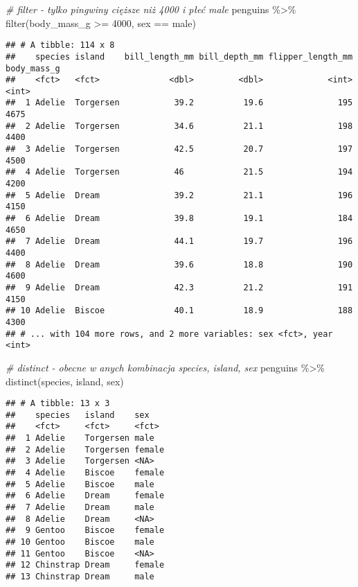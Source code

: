 \documentclass[
]{book}
\newenvironment{Shaded}{\begin{snugshade}}{\end{snugshade}}
\newcommand{\CommentTok}[1]{\textcolor[rgb]{0.56,0.35,0.01}{\textit{#1}}}
\newcommand{\DecValTok}[1]{\textcolor[rgb]{0.00,0.00,0.81}{#1}}
\newcommand{\FunctionTok}[1]{\textcolor[rgb]{0.00,0.00,0.00}{#1}}
\newcommand{\NormalTok}[1]{#1}
\newcommand{\SpecialCharTok}[1]{\textcolor[rgb]{0.00,0.00,0.00}{#1}}
\newcommand{\StringTok}[1]{\textcolor[rgb]{0.31,0.60,0.02}{#1}}
\begin{document}
\begin{Shaded}
\begin{Highlighting}[]
\CommentTok{\# filter {-} tylko pingwiny cięższe niż 4000 i płeć male}
\NormalTok{penguins }\SpecialCharTok{\%\textgreater{}\%} \FunctionTok{filter}\NormalTok{(body\_mass\_g }\SpecialCharTok{\textgreater{}=} \DecValTok{4000}\NormalTok{, sex }\SpecialCharTok{==} \StringTok{\textquotesingle{}male\textquotesingle{}}\NormalTok{)}
\end{Highlighting}
\end{Shaded}

\begin{verbatim}
## # A tibble: 114 x 8
##    species island    bill_length_mm bill_depth_mm flipper_length_mm body_mass_g
##    <fct>   <fct>              <dbl>         <dbl>             <int>       <int>
##  1 Adelie  Torgersen           39.2          19.6               195        4675
##  2 Adelie  Torgersen           34.6          21.1               198        4400
##  3 Adelie  Torgersen           42.5          20.7               197        4500
##  4 Adelie  Torgersen           46            21.5               194        4200
##  5 Adelie  Dream               39.2          21.1               196        4150
##  6 Adelie  Dream               39.8          19.1               184        4650
##  7 Adelie  Dream               44.1          19.7               196        4400
##  8 Adelie  Dream               39.6          18.8               190        4600
##  9 Adelie  Dream               42.3          21.2               191        4150
## 10 Adelie  Biscoe              40.1          18.9               188        4300
## # ... with 104 more rows, and 2 more variables: sex <fct>, year <int>
\end{verbatim}

\begin{Shaded}
\begin{Highlighting}[]
\CommentTok{\# distinct {-} obecne w anych kombinacja species, island, sex}
\NormalTok{penguins }\SpecialCharTok{\%\textgreater{}\%} \FunctionTok{distinct}\NormalTok{(species, island, sex)}
\end{Highlighting}
\end{Shaded}

\begin{verbatim}
## # A tibble: 13 x 3
##    species   island    sex   
##    <fct>     <fct>     <fct> 
##  1 Adelie    Torgersen male  
##  2 Adelie    Torgersen female
##  3 Adelie    Torgersen <NA>  
##  4 Adelie    Biscoe    female
##  5 Adelie    Biscoe    male  
##  6 Adelie    Dream     female
##  7 Adelie    Dream     male  
##  8 Adelie    Dream     <NA>  
##  9 Gentoo    Biscoe    female
## 10 Gentoo    Biscoe    male  
## 11 Gentoo    Biscoe    <NA>  
## 12 Chinstrap Dream     female
## 13 Chinstrap Dream     male
\end{verbatim}
\end{document}
